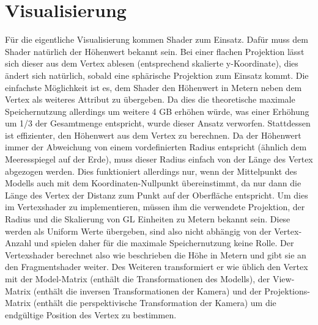 \section{Visualisierung}
Für die eigentliche Visualisierung kommen Shader zum Einsatz. Dafür muss dem Shader natürlich der Höhenwert bekannt sein. Bei einer flachen Projektion lässt sich dieser aus dem Vertex ablesen (entsprechend skalierte y-Koordinate), dies ändert sich natürlich, sobald eine sphärische Projektion zum Einsatz kommt. Die einfachste Möglichkeit ist es, dem Shader den Höhenwert in Metern neben dem Vertex als weiteres Attribut zu übergeben. Da dies die theoretische maximale Speichernutzung allerdings um weitere 4 GB erhöhen würde, was einer Erhöhung um 1/3 der Gesamtmenge entspricht, wurde dieser Ansatz verworfen. Stattdessen ist effizienter, den Höhenwert aus dem Vertex zu berechnen. Da der Höhenwert immer der Abweichung von einem vordefinierten Radius entspricht (ähnlich dem Meeresspiegel auf der Erde), muss dieser Radius einfach von der Länge des Vertex abgezogen werden. Dies funktioniert allerdings nur, wenn der Mittelpunkt des Modells auch mit dem Koordinaten-Nullpunkt übereinstimmt, da nur dann die Länge des Vertex der Distanz zum Punkt auf der Oberfläche entspricht. Um dies im Vertexshader zu implementieren, müssen ihm die verwendete Projektion, der Radius und die Skalierung von GL Einheiten zu Metern bekannt sein. Diese werden als Uniform Werte übergeben, sind also nicht abhängig von der Vertex-Anzahl und spielen daher für die maximale Speichernutzung keine Rolle. Der Vertexshader berechnet also wie beschrieben die Höhe in Metern und gibt sie an den Fragmentshader weiter. Des Weiteren transformiert er wie üblich den Vertex mit der Model-Matrix (enthält die Transformationen des Modells), der View-Matrix (enthält die inversen Transformationen der Kamera) und der Projektions-Matrix (enthält die perspektivische Transformation der Kamera) um die endgültige Position des Vertex zu bestimmen.

